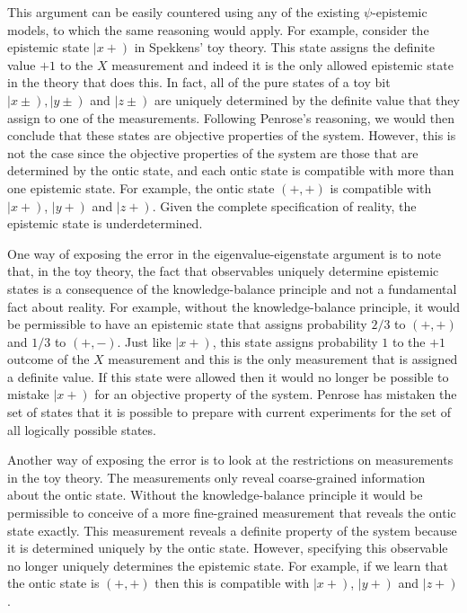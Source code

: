 \documentclass[DIV=calc,paper=a4,fontsize=11pt,twocolumn]{scrartcl} %
\theoremstyle{definition}
\theoremstyle{plain}
\newcommand{\RKet}[1]{\ensuremath{\left \vert #1 \right )}}
\begin{document}
This argument can be easily countered using any of the existing
$\psi$-epistemic models, to which the same reasoning would apply.  For
example, consider the epistemic state $\RKet{x+}$ in Spekkens' toy
theory.  This state assigns the definite value $+1$ to the $X$
measurement and indeed it is the only allowed epistemic state in the
theory that does this.  In fact, all of the pure states of a toy bit
$\RKet{x \pm}, \RKet{y \pm}$ and $\RKet{z \pm}$ are uniquely
determined by the definite value that they assign to one of the
measurements.  Following Penrose's reasoning, we would then conclude
that these states are objective properties of the system.  However,
this is not the case since the objective properties of the system are
those that are determined by the ontic state, and each ontic state is
compatible with more than one epistemic state.  For example, the ontic
state $(+,+)$ is compatible with $\RKet{x+}$, $\RKet{y+}$ and
$\RKet{z+}$.  Given the complete specification of reality, the
epistemic state is underdetermined.

One way of exposing the error in the eigenvalue-eigenstate argument is
to note that, in the toy theory, the fact that observables uniquely
determine epistemic states is a consequence of the knowledge-balance
principle and not a fundamental fact about reality.  For example,
without the knowledge-balance principle, it would be permissible to
have an epistemic state that assigns probability $2/3$ to $(+,+)$ and
$1/3$ to $(+,-)$.  Just like $\RKet{x+}$, this state assigns
probability $1$ to the $+1$ outcome of the $X$ measurement and this is
the only measurement that is assigned a definite value.  If this state
were allowed then it would no longer be possible to mistake
$\RKet{x+}$ for an objective property of the system.  Penrose has
mistaken the set of states that it is possible to prepare with current
experiments for the set of all logically possible states.

Another way of exposing the error is to look at the restrictions on
measurements in the toy theory.  The measurements only reveal
coarse-grained information about the ontic state.  Without the
knowledge-balance principle it would be permissible to conceive of a
more fine-grained measurement that reveals the ontic state exactly.
This measurement reveals a definite property of the system because it
is determined uniquely by the ontic state.  However, specifying this
observable no longer uniquely determines the epistemic state.  For
example, if we learn that the ontic state is $(+,+)$ then this is
compatible with $\RKet{x+}$, $\RKet{y+}$ and $\RKet{z+}$.
\end{document}
